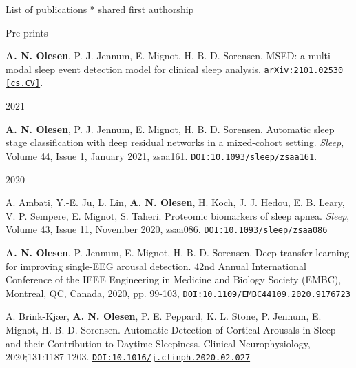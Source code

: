 \documentclass{resume} %
\begin{document}
\begin{rSection}{List of publications}
	\medskip
    \mbox{*} shared first authorship
    
    \begin{rSubsection}{Pre-prints}{}{}{}
        \item \textbf{A. N. Olesen}, P. J. Jennum, E. Mignot, H. B. D. Sorensen. MSED: a multi-modal sleep event detection model for clinical sleep analysis. \href{https://arxiv.org/abs/2101.02530}{\texttt{arXiv:2101.02530 [cs.CV]}}.
    \end{rSubsection}
    
    \begin{rSubsection}{2021}{}{}{}
        \item \textbf{A. N. Olesen}, P. J. Jennum, E. Mignot, H. B. D. Sorensen. Automatic sleep stage classification with deep residual networks in a mixed-cohort setting. \textit{Sleep}, Volume 44, Issue 1, January 2021, zsaa161. \href{https://doi.org/10.1093/sleep/zsaa161}{\texttt{DOI:10.1093/sleep/zsaa161}}.
    \end{rSubsection}
    
    \begin{rSubsection}{2020}{}{}{}
        
        \item A. Ambati, Y.-E. Ju, L. Lin, \textbf{A. N. Olesen}, H. Koch, J. J. Hedou, E. B. Leary, V. P. Sempere, E. Mignot, S. Taheri. Proteomic biomarkers of sleep apnea. \textit{Sleep}, Volume 43, Issue 11, November 2020, zsaa086. \href{https://doi.org/10.1093/sleep/zsaa086}{\texttt{DOI:10.1093/sleep/zsaa086}}
        
        \item \textbf{A. N. Olesen}, P. Jennum, E. Mignot, H. B. D. Sorensen. Deep transfer learning for improving single-EEG arousal detection. 42nd Annual International Conference of the IEEE Engineering in Medicine and Biology Society (EMBC), Montreal, QC, Canada, 2020, pp. 99-103, \href{https://doi.org/10.1109/EMBC44109.2020.9176723}{\texttt{DOI:10.1109/EMBC44109.2020.9176723}}
        
        \item A. Brink-Kjær, \textbf{A. N. Olesen}, P. E. Peppard, K. L. Stone, P. Jennum, E. Mignot, H. B. D. Sorensen. Automatic Detection of Cortical Arousals in Sleep and their Contribution to Daytime Sleepiness. Clinical Neurophysiology, 2020;131:1187-1203. \href{https://doi.org/10.1016/j.clinph.2020.02.027}{\texttt{DOI:10.1016/j.clinph.2020.02.027}}
	    

\end{rSubsection}
\end{rSection}
\end{document}
